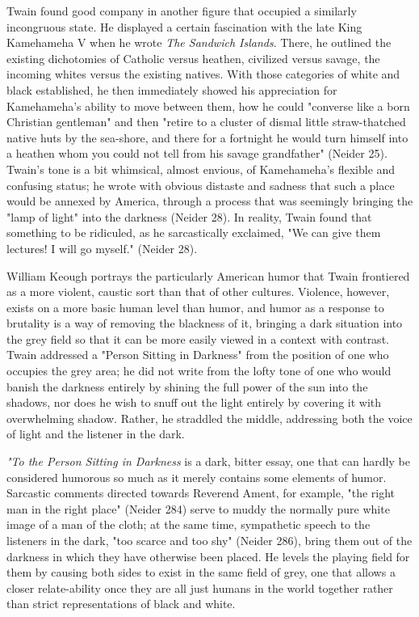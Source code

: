 Twain found good company in another figure that occupied a similarly incongruous
state. He displayed a certain fascination with the late King Kamehameha V when
he wrote \textit{The Sandwich Islands}. There, he outlined the existing
dichotomies of Catholic versus heathen, civilized versus savage, the incoming
whites versus the existing natives. With those categories of white and black
established, he then immediately showed his appreciation for Kamehameha's
ability to move between them, how he could "converse like a born Christian
gentleman" and then "retire to a cluster of dismal little straw-thatched native
huts by the sea-shore, and there for a fortnight he would turn himself into a
heathen whom you could not tell from his savage grandfather" (Neider 25).
Twain's tone is a bit whimsical, almost envious, of Kamehameha's flexible and
confusing status; he wrote with obvious distaste and sadness that such a place
would be annexed by America, through a process that was seemingly bringing the
"lamp of light" into the darkness (Neider 28). In reality, Twain found that
something to be ridiculed, as he sarcastically exclaimed, "We can give them
lectures! I will go myself." (Neider 28).

William Keough portrays the particularly American humor that Twain frontiered as
a more violent, caustic sort than that of other cultures. Violence, however,
exists on a more basic human level than humor, and humor as a response to
brutality is a way of removing the blackness of it, bringing a dark situation
into the grey field so that it can be more easily viewed in a context with
contrast. Twain addressed a "Person Sitting in Darkness" from the position of
one who occupies the grey area; he did not write from the lofty tone of one who
would banish the darkness entirely by shining the full power of the sun into the
shadows, nor does he wish to snuff out the light entirely by covering it with
overwhelming shadow. Rather, he straddled the middle, addressing both the voice
of light and the listener in the dark.

\textit{"To the Person Sitting in Darkness} is a dark, bitter essay, one that
can hardly be considered humorous so much as it merely contains some elements of
humor. Sarcastic comments directed towards Reverend Ament, for example, "the
right man in the right place" (Neider 284) serve to muddy the normally pure
white image of a man of the cloth; at the same time, sympathetic speech to the
listeners in the dark, "too scarce and too shy" (Neider 286), bring them out of
the darkness in which they have otherwise been placed. He levels the playing
field for them by causing both sides to exist in the same field of grey, one
that allows a closer relate-ability once they are all just humans in the world
together rather than strict representations of black and white.

